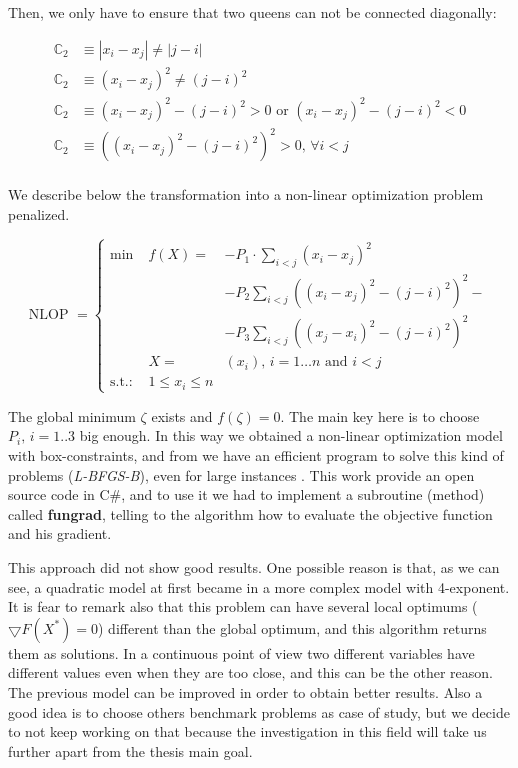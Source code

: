 Then, we only have to ensure that two queens can not be connected diagonally:

\begin{align*}
\mathbb{C}_2 &\equiv \left|x_i - x_j\right| \neq \left|j - i\right|\\
\mathbb{C}_2 &\equiv \left(x_i - x_j\right)^2 \neq \left(j - i\right)^2\\
\mathbb{C}_2 &\equiv \left(x_i - x_j \right)^2 - (j - i)^2 > 0 \text{  or  } \left(x_i - x_j\right)^2 - (j - i)^2 < 0\\
\mathbb{C}_2 &\equiv \left(\left(x_i - x_j \right)^2 - (j - i)^2\right)^2 > 0\text{, }\forall i < j\\
\end{align*}

We describe below the transformation into a non-linear optimization problem penalized.

\begin{equation}
\text{NLOP } = \left\{
\begin{array}{rrl}
\min & f(X) = & -P_1\cdot\sum\limits_{i < j}{\left(x_i - x_j\right)^2}\\
 & & - P_2\sum\limits_{i < j}{\left(\left(x_i - x_j \right)^2 - (j - i)^2\right)^2}-\\
 & & - P_3\sum\limits_{i < j}{\left(\left(x_j - x_i \right)^2 - (j - i)^2\right)^2}\\
 & X = & (x_i)\text{, } i = 1\dots n \text{ and } i < j\\
\text{s.t.: } & 1 \leq x_i \leq n & 
\end{array}
\right.
\end{equation}

The global minimum $\zeta$ exists and $f(\zeta) = 0$. The main key here is to choose $P_i\text{, }i=1..3$ big enough. In this way we obtained a non-linear optimization model with box-constraints, and from \cite{Zhu1994, Byrd1994, Liu1989} we have an efficient program to solve this kind of problems (\textit{L-BFGS-B}), even for large instances \cite{Nocedal1996}. This work provide an open source code in C\#, and to use it we had to implement a subroutine (method) called \textbf{fungrad}, telling to the algorithm how to evaluate the objective function and his gradient.

This approach did not show good results. One possible reason is that, as we can see, a quadratic model at first became in a more complex model with 4-exponent. It is fear to remark also that this problem can have several local optimums ($\bigtriangledown F(X^*) = 0$) different than the global optimum, and this algorithm returns them as solutions. In a continuous point of view two different variables have different values even when they are too close, and this can be the other reason. The previous model can be improved in order to obtain better results. Also a good idea is to choose others benchmark problems as case of study, but we decide to not keep working on that because the investigation in this field will take us further apart from the thesis main goal.